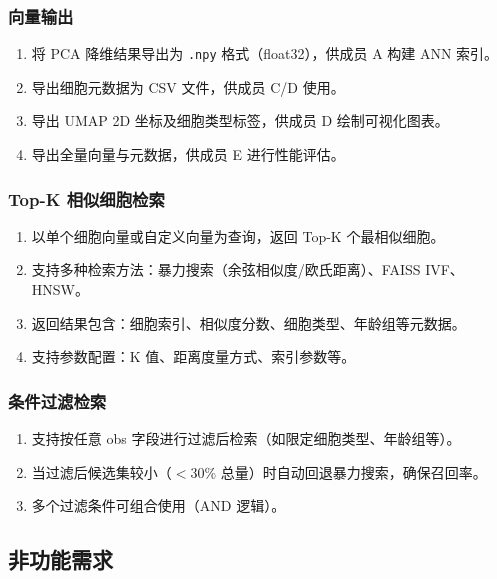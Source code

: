 \documentclass[12pt,a4paper]{ctexart}
\begin{document}
\subsubsection{向量输出}

\begin{enumerate}[label=FR-\arabic*:,leftmargin=*,resume]
    \item 将 PCA 降维结果导出为 \texttt{.npy} 格式（float32），供成员 A 构建 ANN 索引。
    \item 导出细胞元数据为 CSV 文件，供成员 C/D 使用。
    \item 导出 UMAP 2D 坐标及细胞类型标签，供成员 D 绘制可视化图表。
    \item 导出全量向量与元数据，供成员 E 进行性能评估。
\end{enumerate}

\subsubsection{Top-K 相似细胞检索}

\begin{enumerate}[label=FR-\arabic*:,leftmargin=*,resume]
    \item 以单个细胞向量或自定义向量为查询，返回 Top-K 个最相似细胞。
    \item 支持多种检索方法：暴力搜索（余弦相似度/欧氏距离）、FAISS IVF、HNSW。
    \item 返回结果包含：细胞索引、相似度分数、细胞类型、年龄组等元数据。
    \item 支持参数配置：K 值、距离度量方式、索引参数等。
\end{enumerate}

\subsubsection{条件过滤检索}

\begin{enumerate}[label=FR-\arabic*:,leftmargin=*,resume]
    \item 支持按任意 obs 字段进行过滤后检索（如限定细胞类型、年龄组等）。
    \item 当过滤后候选集较小（$<30\%$ 总量）时自动回退暴力搜索，确保召回率。
    \item 多个过滤条件可组合使用（AND 逻辑）。
\end{enumerate}

\subsection{非功能需求}
\end{document}
